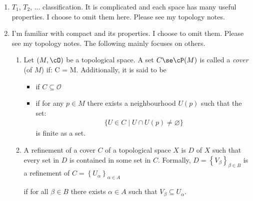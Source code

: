 \documentclass{article}
\begin{document}
\begin{enumerate}
    \item {} $T_1$, $T_2$, ... classification. It is complicated and each space has many useful properties. I choose to omit them here. Please see my topology notes.
    
    \item {} I'm familiar with compact and its properties. I choose to omit them.  Please see my topology notes. The following mainly focuses on others. 
    \begin{enumerate}
    \item {} Let $(M,\cO)$ be a topological space. A set $C \se \cP(M)$ is called a \emph{cover} (of $M$) if:
\bse
\bigcup C = M.
\ese
Additionally, it is said to be \begin{itemize}
                \item {} if $C \subseteq \mathcal{O}$
                \item  {} if for any $p \in M$ there exists a neighbourhood $U(p)$ such that the set:
\begin{align*}
\{U \in C \mid U \cap U(p) \neq \varnothing\}
\end{align*}
is finite as a set.  \end{itemize}
        \item {} A refinement of a cover $C$ of a topological space $X$ is  $D$ of $X$ such that every set in $D$ is contained in some set in $C$. Formally, $D=\left\{V_{\beta}\right\}_{\beta \in B}$ is a refinement of $C=\left\{U_{\alpha}\right\}_{\alpha \in A}$
        
        \centerline{if for all $\beta \in B$ there exists $\alpha \in A$ such that $V_{\beta} \subseteq U_{\alpha}$.}
        

\end{enumerate}
\end{enumerate}
\end{document}

